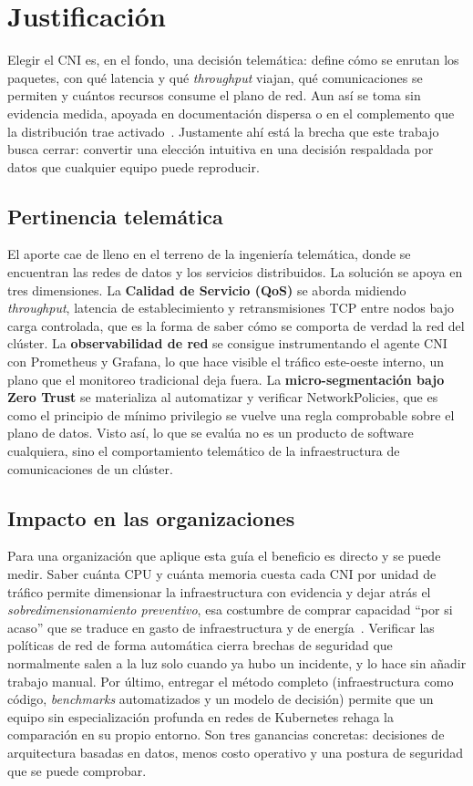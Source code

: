 \section{Justificación} \label{sec:Justificacion}

Elegir el CNI es, en el fondo, una decisión telemática: define cómo se enrutan los paquetes, con qué latencia y qué \emph{throughput} viajan, qué comunicaciones se permiten y cuántos recursos consume el plano de red. Aun así se toma sin evidencia medida, apoyada en documentación dispersa o en el complemento que la distribución trae activado~\cite{ref29}. Justamente ahí está la brecha que este trabajo busca cerrar: convertir una elección intuitiva en una decisión respaldada por datos que cualquier equipo puede reproducir.

\subsection{Pertinencia telemática}

El aporte cae de lleno en el terreno de la ingeniería telemática, donde se encuentran las redes de datos y los servicios distribuidos. La solución se apoya en tres dimensiones. La \textbf{Calidad de Servicio (QoS)} se aborda midiendo \emph{throughput}, latencia de establecimiento y retransmisiones TCP entre nodos bajo carga controlada, que es la forma de saber cómo se comporta de verdad la red del clúster. La \textbf{observabilidad de red} se consigue instrumentando el agente CNI con Prometheus y Grafana, lo que hace visible el tráfico este-oeste interno, un plano que el monitoreo tradicional deja fuera. La \textbf{micro-segmentación bajo Zero Trust} se materializa al automatizar y verificar NetworkPolicies, que es como el principio de mínimo privilegio se vuelve una regla comprobable sobre el plano de datos. Visto así, lo que se evalúa no es un producto de software cualquiera, sino el comportamiento telemático de la infraestructura de comunicaciones de un clúster.

\subsection{Impacto en las organizaciones}

Para una organización que aplique esta guía el beneficio es directo y se puede medir. Saber cuánta CPU y cuánta memoria cuesta cada CNI por unidad de tráfico permite dimensionar la infraestructura con evidencia y dejar atrás el \emph{sobredimensionamiento preventivo}, esa costumbre de comprar capacidad ``por si acaso'' que se traduce en gasto de infraestructura y de energía~\cite{ref7,ref8}. Verificar las políticas de red de forma automática cierra brechas de seguridad que normalmente salen a la luz solo cuando ya hubo un incidente, y lo hace sin añadir trabajo manual. Por último, entregar el método completo (infraestructura como código, \emph{benchmarks} automatizados y un modelo de decisión) permite que un equipo sin especialización profunda en redes de Kubernetes rehaga la comparación en su propio entorno. Son tres ganancias concretas: decisiones de arquitectura basadas en datos, menos costo operativo y una postura de seguridad que se puede comprobar.

